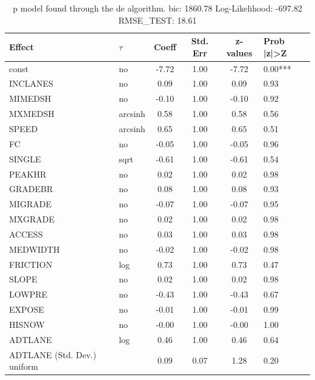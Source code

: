 \begin{table}
	\caption{p model found through the de algorithm. bic: 1860.78 Log-Likelihood: -697.82 RMSE_TEST: 18.61}
	\begin{center}
		\begin{tabular}{|l|l|c|c|c|l|}
			\hline
			Effect & $\tau$ & Coeff & Std. Err & z-values & Prob |z|>Z \\
			\hline
			const & no & -7.72 & 1.00 & -7.72 & 0.00*** \\
			\hline
			INCLANES & no & 0.09 & 1.00 & 0.09 & 0.93 \\
			\hline
			MIMEDSH & no & -0.10 & 1.00 & -0.10 & 0.92 \\
			\hline
			MXMEDSH & arcsinh & 0.58 & 1.00 & 0.58 & 0.56 \\
			\hline
			SPEED & arcsinh & 0.65 & 1.00 & 0.65 & 0.51 \\
			\hline
			FC & no & -0.05 & 1.00 & -0.05 & 0.96 \\
			\hline
			SINGLE & sqrt & -0.61 & 1.00 & -0.61 & 0.54 \\
			\hline
			PEAKHR & no & 0.02 & 1.00 & 0.02 & 0.98 \\
			\hline
			GRADEBR & no & 0.08 & 1.00 & 0.08 & 0.93 \\
			\hline
			MIGRADE & no & -0.07 & 1.00 & -0.07 & 0.95 \\
			\hline
			MXGRADE & no & 0.02 & 1.00 & 0.02 & 0.98 \\
			\hline
			ACCESS & no & 0.03 & 1.00 & 0.03 & 0.98 \\
			\hline
			MEDWIDTH & no & -0.02 & 1.00 & -0.02 & 0.98 \\
			\hline
			FRICTION & log & 0.73 & 1.00 & 0.73 & 0.47 \\
			\hline
			SLOPE & no & 0.02 & 1.00 & 0.02 & 0.98 \\
			\hline
			LOWPRE & no & -0.43 & 1.00 & -0.43 & 0.67 \\
			\hline
			EXPOSE & no & -0.01 & 1.00 & -0.01 & 0.99 \\
			\hline
			HISNOW & no & -0.00 & 1.00 & -0.00 & 1.00 \\
			\hline
			ADTLANE & log & 0.46 & 1.00 & 0.46 & 0.64 \\
			\hline
			ADTLANE (Std. Dev.) uniform &  & 0.09 & 0.07 & 1.28 & 0.20 \\
			\hline
		\end{tabular}
	\end{center}
\end{table}
